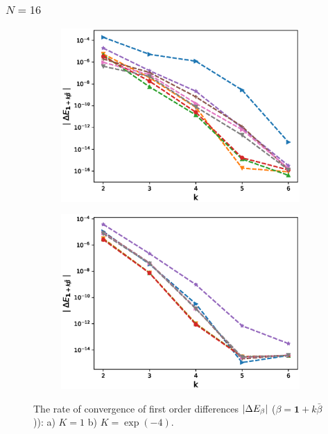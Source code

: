 \documentclass[11pt]{article}
\begin{document}
\newpage
\subsubsection*{$N=16$ }
\begin{figure}[h!]
	\centering
	\begin{subfigure}{.5\textwidth}
		\centering
		\includegraphics[width=1\linewidth]{./figures/mixed_diff_second_way/H_007/N_16/first_difference_rbergomi_16steps_H_007_K_1.eps}
		\caption{}
		\label{fig:sub3}
	\end{subfigure}%
	\begin{subfigure}{.5\textwidth}
		\centering
		\includegraphics[width=1\linewidth]{./figures/mixed_diff_second_way/H_007/N_16/first_difference_rbergomi_16steps_H_007_K_exp__4.eps}
		\caption{}
		\label{fig:sub4}
	\end{subfigure}
	
	\caption{The rate of convergence of  first order differences $\left\lvert\Delta E_{\beta}\right\rvert$ ($\beta=\mathbf{1}+k \bar{\beta}$)): a) $K=1$ b)  $K=\operatorname{exp}(-4).$}
	\label{fig:test2}
\end{figure}
\end{document}
